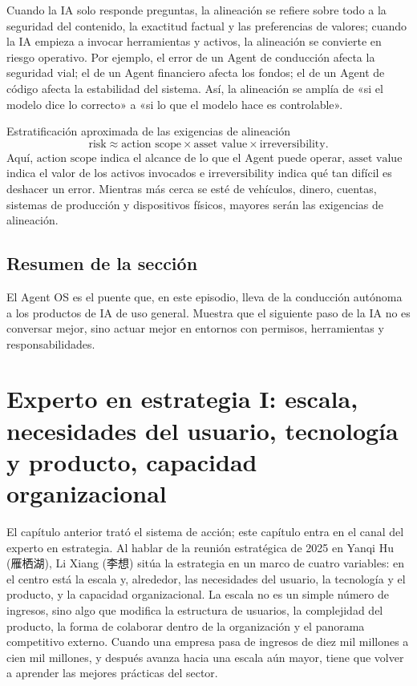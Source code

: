 \documentclass[a4paper]{article}
\begin{document}
Cuando la IA solo responde preguntas, la alineación se refiere sobre todo a la seguridad del contenido, la exactitud factual y las preferencias de valores; cuando la IA empieza a invocar herramientas y activos, la alineación se convierte en riesgo operativo. Por ejemplo, el error de un Agent de conducción afecta la seguridad vial; el de un Agent financiero afecta los fondos; el de un Agent de código afecta la estabilidad del sistema. Así, la alineación se amplía de «si el modelo dice lo correcto» a «si lo que el modelo hace es controlable».

\begin{knowledgebox}{Estratificación aproximada de las exigencias de alineación}
\[
\text{risk} \approx \text{action scope} \times \text{asset value} \times \text{irreversibility}.
\]
Aquí, \(\text{action scope}\) indica el alcance de lo que el Agent puede operar, \(\text{asset value}\) indica el valor de los activos invocados e \(\text{irreversibility}\) indica qué tan difícil es deshacer un error. Mientras más cerca se esté de vehículos, dinero, cuentas, sistemas de producción y dispositivos físicos, mayores serán las exigencias de alineación.
\end{knowledgebox}

\subsection{Resumen de la sección}

El Agent OS es el puente que, en este episodio, lleva de la conducción autónoma a los productos de IA de uso general. Muestra que el siguiente paso de la IA no es conversar mejor, sino actuar mejor en entornos con permisos, herramientas y responsabilidades.
\section{Experto en estrategia I: escala, necesidades del usuario, tecnología y producto, capacidad organizacional}

El capítulo anterior trató el sistema de acción; este capítulo entra en el canal del experto en estrategia. Al hablar de la reunión estratégica de 2025 en Yanqi Hu (雁栖湖), Li Xiang (李想) sitúa la estrategia en un marco de cuatro variables: en el centro está la escala y, alrededor, las necesidades del usuario, la tecnología y el producto, y la capacidad organizacional. La escala no es un simple número de ingresos, sino algo que modifica la estructura de usuarios, la complejidad del producto, la forma de colaborar dentro de la organización y el panorama competitivo externo. Cuando una empresa pasa de ingresos de diez mil millones a cien mil millones, y después avanza hacia una escala aún mayor, tiene que volver a aprender las mejores prácticas del sector.
\end{document}
